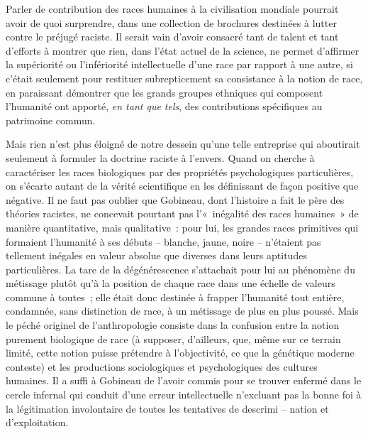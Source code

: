 \documentclass[french,twoside]{book} %
\begin{document}
\noindent Parler de contribution des races humaines à la civilisation mondiale pourrait avoir de quoi surprendre, dans une collection de brochures destinées à lutter contre le préjugé raciste. Il serait vain d’avoir consacré tant de talent et tant d’efforts à montrer que rien, dans l’état actuel de la science, ne permet d’affirmer la supériorité ou l’infériorité intellectuelle d’une race par rapport à une autre, si c’était seulement pour restituer subrepticement sa consistance à la notion de race, en paraissant démontrer que les grands groupes ethniques qui composent l’humanité ont apporté, \emph{en tant que tels}, des contributions spécifiques au patrimoine commun.\par
Mais rien n’est plus éloigné de notre dessein qu’une telle entreprise qui aboutirait seulement à formuler la doctrine raciste à l’envers. Quand on cherche à caractériser les races biologiques par des propriétés psychologiques particulières, on s’écarte autant de la vérité scientifique en les définissant de façon positive que négative. Il ne faut pas oublier que Gobineau, dont l’histoire a fait le père des théories racistes, ne concevait pourtant pas l’« inégalité des races humaines » de manière quantitative, mais qualitative : pour lui, les grandes races primitives qui formaient l’humanité à ses débuts – blanche, jaune, noire – n’étaient pas tellement inégales en valeur absolue que diverses dans leurs aptitudes particulières. La tare de la dégénérescence s’attachait pour lui au phénomène du métissage plutôt qu’à la position de chaque race dans une échelle de valeurs commune à toutes ; elle était donc destinée à frapper l’humanité tout entière, condamnée, sans distinction de race, à un métissage de plus en plus poussé. Mais le péché originel de l’anthropologie consiste dans la confusion entre la notion purement biologique de race (à supposer, d’ailleurs, que, même sur ce terrain limité, cette notion puisse prétendre à l’objectivité, ce que la génétique moderne conteste) et les productions sociologiques et psychologiques des cultures humaines. Il a suffi à Gobineau de l’avoir commis pour se trouver enfermé dans le cercle infernal qui conduit d’une erreur intellectuelle n’excluant pas la bonne foi à la légitimation involontaire de toutes les tentatives de descrimi – nation et d’exploitation.\par
\end{document}
